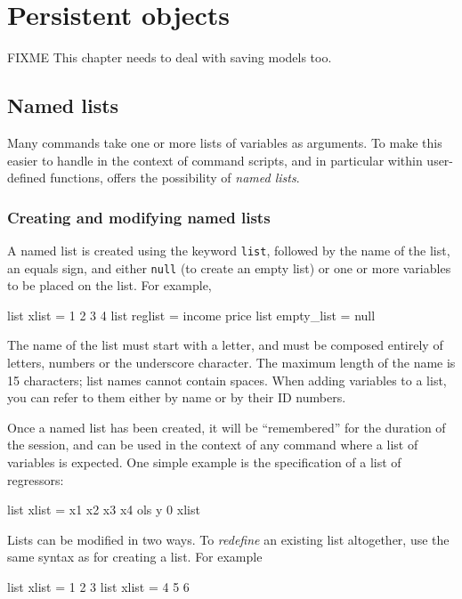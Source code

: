 \chapter{Persistent objects}
\label{chap-persist}


FIXME This chapter needs to deal with saving models too.

\section{Named lists}
\label{named-lists}

Many  commands take one or more lists of variables as
arguments.  To make this easier to handle in the context of command
scripts, and in particular within user-defined functions, 
offers the possibility of \textit{named lists}.  

\subsection{Creating and modifying named lists}

A named list is created using the keyword \texttt{list}, followed by
the name of the list, an equals sign, and either \texttt{null} (to
create an empty list) or one or more variables to be placed on the
list.  For example,
%
\begin{code}
list xlist = 1 2 3 4
list reglist = income price 
list empty_list = null
\end{code}

The name of the list must start with a letter, and must be composed
entirely of letters, numbers or the underscore character.  The maximum
length of the name is 15 characters; list names cannot contain
spaces.  When adding variables to a list, you can refer to them either
by name or by their ID numbers. 

Once a named list has been created, it will be ``remembered'' for the
duration of the  session, and can be used in the context of
any  command where a list of variables is expected.  One
simple example is the specification of a list of regressors:
%
\begin{code}
list xlist = x1 x2 x3 x4
ols y 0 xlist
\end{code}

Lists can be modified in two ways.  To \textit{redefine} an existing
list altogether, use the same syntax as for creating a list.  For
example
%
\begin{code}
list xlist = 1 2 3
list xlist = 4 5 6
\end{code}

